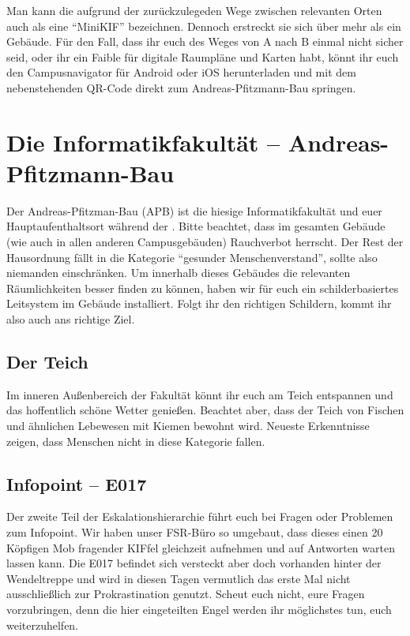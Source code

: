 
\begin{figure}
  \vspace*{-11pt}
  \textcolor{KIFgrey}{}
\end{figure}

Man kann die \KIF{} aufgrund der zurückzulegeden Wege zwischen relevanten Orten auch als eine \enquote{MiniKIF} bezeichnen. Dennoch erstreckt sie sich über mehr als ein Gebäude.
Für den Fall, dass ihr euch des Weges von A nach B einmal nicht sicher seid, oder ihr ein Faible für digitale Raumpläne und Karten habt, könnt ihr euch den Campusnavigator für Android  oder iOS  herunterladen und mit dem nebenstehenden QR-Code direkt zum Andreas-Pfitzmann-Bau springen.

\section*{Die Informatikfakultät -- Andreas-Pfitzmann-Bau}
Der Andreas-Pfitzman-Bau (APB) ist die hiesige Informatikfakultät und euer Hauptaufenthaltsort während der \KIF{}.
Bitte beachtet, dass im gesamten Gebäude (wie auch in allen anderen Campusgebäuden) Rauchverbot herrscht.
Der Rest der Hausordnung fällt in die Kategorie \enquote{gesunder Menschenverstand}, sollte also niemanden einschränken.
Um innerhalb dieses Gebäudes die relevanten Räumlichkeiten besser finden zu können, haben wir für euch ein schilderbasiertes Leitsystem im Gebäude installiert.
Folgt ihr den richtigen Schildern, kommt ihr also auch ans richtige Ziel.

\subsection*{Der Teich}
Im inneren Außenbereich der Fakultät könnt ihr euch am Teich entspannen und das hoffentlich schöne Wetter genießen.
Beachtet aber, dass der Teich von Fischen und ähnlichen Lebewesen mit Kiemen bewohnt wird.
Neueste Erkenntnisse zeigen, dass Menschen nicht in diese Kategorie fallen.

\subsection*{Infopoint -- E017}
Der zweite Teil der Eskalationshierarchie führt euch bei Fragen oder Problemen zum Infopoint.
Wir haben unser FSR-Büro so umgebaut, dass dieses einen 20 Köpfigen Mob fragender KIFfel gleichzeit aufnehmen und auf Antworten warten lassen kann.
Die E017 befindet sich versteckt aber doch vorhanden hinter der Wendeltreppe und wird in diesen Tagen vermutlich das erste Mal nicht ausschließlich zur Prokrastination genutzt.
Scheut euch nicht, eure Fragen vorzubringen, denn die hier eingeteilten Engel werden ihr möglichstes tun, euch weiterzuhelfen.


